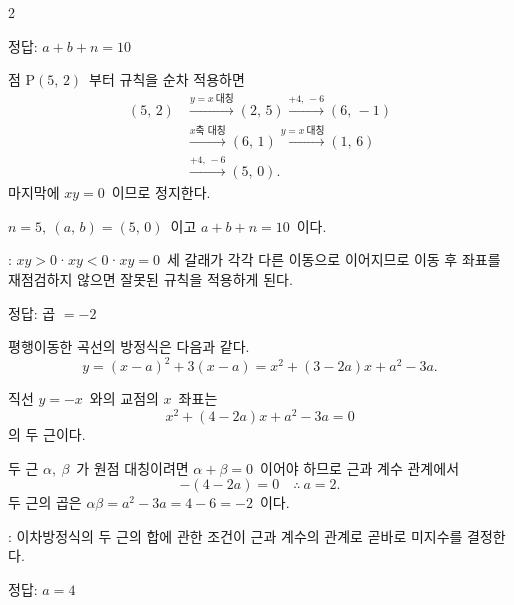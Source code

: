 \documentclass[10pt,fleqn]{article}
\begin{document}
\begin{multicols*}{2}
\begin{dmanswerbox}
정답: $a+b+n=10$
\end{dmanswerbox}

점 $\mathrm{P}(5,\, 2)$\ 부터 규칙을 순차 적용하면
\begin{align*}
(5,\, 2) &\xrightarrow{y=x\ \text{대칭}} (2,\, 5) \xrightarrow{+4,\, -6} (6,\, -1) \\
&\xrightarrow{x\text{축 대칭}} (6,\, 1) \xrightarrow{y=x\ \text{대칭}} (1,\, 6) \\
&\xrightarrow{+4,\, -6} (5,\, 0).
\end{align*}
마지막에 $xy = 0$\ 이므로 정지한다.

$n = 5,\ (a,\, b) = (5,\, 0)$\ 이고 $a + b + n = 10$\ 이다.

\begin{dmcriticalpoint}
: $xy > 0$·$xy < 0$·$xy = 0$\ 세 갈래가 각각 다른 이동으로 이어지므로 이동 후 좌표를 재점검하지 않으면 잘못된 규칙을 적용하게 된다.
\end{dmcriticalpoint}

\begin{dmanswerbox}
정답: 곱 $=-2$
\end{dmanswerbox}

평행이동한 곡선의 방정식은 다음과 같다.
\[ y = (x - a)^2 + 3(x - a) = x^2 + (3 - 2a)x + a^2 - 3a. \]

직선 $y = -x$\ 와의 교점의 $x$\ 좌표는
\[ x^2 + (4 - 2a)x + a^2 - 3a = 0 \]
의 두 근이다.

두 근 $\alpha,\ \beta$\ 가 원점 대칭이려면 $\alpha + \beta = 0$\ 이어야 하므로 근과 계수 관계에서
\[ -(4 - 2a) = 0 \quad\therefore\ a = 2. \]
두 근의 곱은 $\alpha\beta = a^2 - 3a = 4 - 6 = -2$\ 이다.

\begin{dmcriticalpoint}
: 이차방정식의 두 근의 합에 관한 조건이 근과 계수의 관계로 곧바로 미지수를 결정한다.
\end{dmcriticalpoint}

\begin{dmanswerbox}
정답: $a=4$
\end{dmanswerbox}


\end{multicols*}
\end{document}
